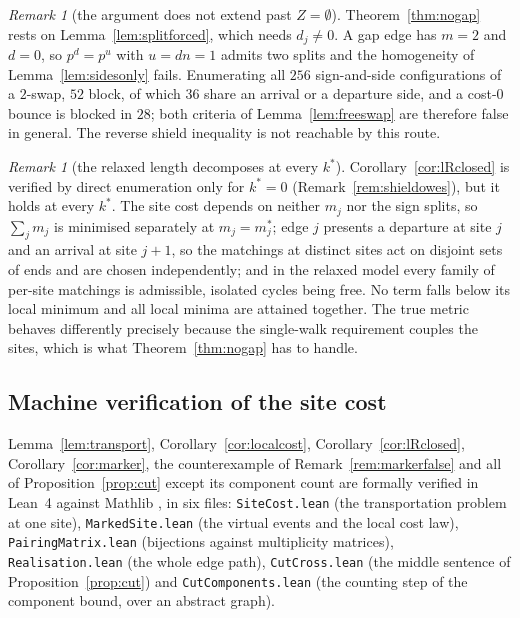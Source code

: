 \documentclass[11pt]{article}
\theoremstyle{plain}
\theoremstyle{definition}
\theoremstyle{remark}
\newtheorem{remark}[theorem]{Remark}
\begin{document}
\begin{remark}[the argument does not extend past $Z=\emptyset$]\label{rem:nogapstops}
Theorem~\ref{thm:nogap} rests on Lemma~\ref{lem:splitforced}, which needs $d_j\ne0$. A gap edge has
$m=2$ and $d=0$, so $p^d=p^u$ with $u=dn=1$ admits two splits and the homogeneity of
Lemma~\ref{lem:sidesonly} fails. Enumerating all $256$ sign-and-side configurations of a $2$-swap,
$52$ block, of which $36$ share an arrival or a departure side, and a cost-$0$ bounce is blocked in
$28$; both criteria of Lemma~\ref{lem:freeswap} are therefore false in general. The reverse shield
inequality is not reachable by this route.
\end{remark}

\begin{remark}[the relaxed length decomposes at every $k^\ast$]\label{rem:decomp}
Corollary~\ref{cor:lRclosed} is verified by direct enumeration only for $k^\ast=0$
(Remark~\ref{rem:shieldowes}), but it holds at every $k^\ast$. The site cost depends on neither
$m_j$ nor the sign splits, so $\sum_j m_j$ is minimised separately at $m_j=m_j^\ast$; edge $j$
presents a departure at site $j$ and an arrival at site $j+1$, so the matchings at distinct sites act
on disjoint sets of ends and are chosen independently; and in the relaxed model every family of
per-site matchings is admissible, isolated cycles being free. No term falls below its local minimum
and all local minima are attained together. The true metric behaves differently precisely because the
single-walk requirement couples the sites, which is what Theorem~\ref{thm:nogap} has to handle.
\end{remark}

\subsection*{Machine verification of the site cost}

Lemma~\ref{lem:transport}, Corollary~\ref{cor:localcost}, Corollary~\ref{cor:lRclosed},
Corollary~\ref{cor:marker}, the counterexample of Remark~\ref{rem:markerfalse} and all of
Proposition~\ref{prop:cut} except its component count are formally verified in Lean~4 against
Mathlib \cite{MathlibCommunity}, in six files: \texttt{SiteCost.lean} (the transportation problem
at one site), \texttt{MarkedSite.lean} (the virtual events and the local cost law),
\texttt{PairingMatrix.lean} (bijections against multiplicity matrices),
\texttt{Realisation.lean} (the whole edge path), \texttt{CutCross.lean} (the middle sentence of
Proposition~\ref{prop:cut}) and \texttt{CutComponents.lean} (the counting step of the component
bound, over an abstract graph).
\end{document}
